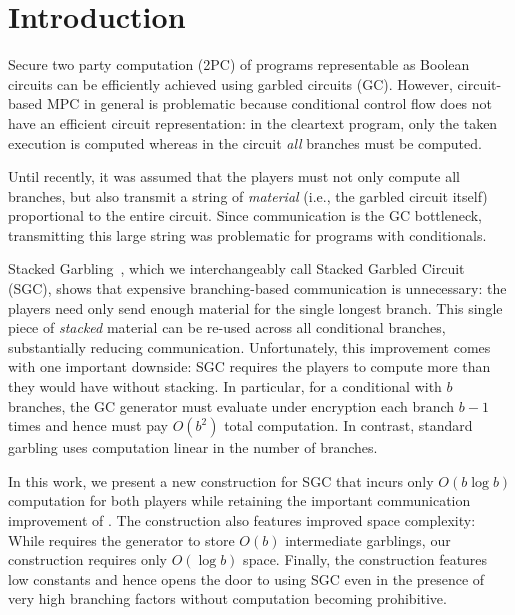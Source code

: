 \section{Introduction}\label{sec:intro}

Secure two party computation (2PC) of programs representable as Boolean circuits can be efficiently achieved using garbled circuits (GC).
%
However,  circuit-based MPC in general is problematic because conditional
control flow does not have an efficient circuit representation:
in the cleartext program, only the taken execution is computed whereas in
the circuit \emph{all} branches must be computed.

%
Until recently, it was assumed that the players must not only compute
all branches, but also transmit a string of \emph{material} (i.e., the garbled circuit itself) 
proportional to the entire circuit.  
Since communication is the GC bottleneck, transmitting this large string was
problematic for programs with conditionals.

Stacked Garbling~\HK, which we %
interchangeably call Stacked Garbled Circuit (SGC), shows that
expensive branching-based communication is unnecessary: the players need only
send enough material for the single longest branch. This single
piece of \emph{stacked} material can be re-used across all conditional branches,
substantially reducing communication.
%
Unfortunately, this improvement comes with one important downside:
SGC requires the players to compute more than they would have without stacking.
In particular, for a conditional with $b$ branches, the \HK GC
generator must evaluate under encryption each branch $b-1$ times and
hence must pay $O(b^2)$ total computation.
In contrast, standard garbling uses computation linear in the number
of branches.

In this work, we present a new construction for SGC that incurs
only $O(b \log b)$ computation for both players while
retaining the important communication improvement of \HK.
%
The construction also features improved space complexity: While \HK
requires the generator to store $O(b)$ intermediate garblings, our
construction requires only $O(\log b)$ space.
%
Finally, the construction features low constants and hence opens the
door to using SGC even in the presence of very high branching factors
without computation becoming prohibitive.


